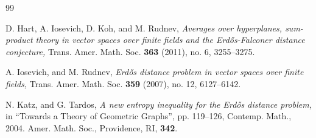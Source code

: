 \documentclass[a4paper,11pt]{amsart}
\numberwithin{equation}{section}
\begin{document}
\begin{thebibliography}{99}


D. Hart, A. Iosevich, D. Koh, and M. Rudnev,
\textit{Averages over hyperplanes, sum-product theory in vector spaces over finite fields and the Erd\H{o}s-Falconer distance conjecture,}
Trans. Amer. Math. Soc. \textbf{363} (2011), no. 6, 3255--3275.










A. Iosevich, and M. Rudnev,
\textit{Erd\H{o}s distance problem in vector spaces over finite fields,}
Trans. Amer. Math. Soc. \textbf{359} (2007), no. 12, 6127--6142.

N. Katz, and G. Tardos,
\textit{A new entropy inequality for the Erd\H{o}s distance problem,} in ``Towards a Theory of Geometric Graphs'', pp. 119--126, Contemp. Math., 2004. Amer. Math. Soc., Providence, RI, \textbf{342}.





\end{thebibliography}
\end{document}
